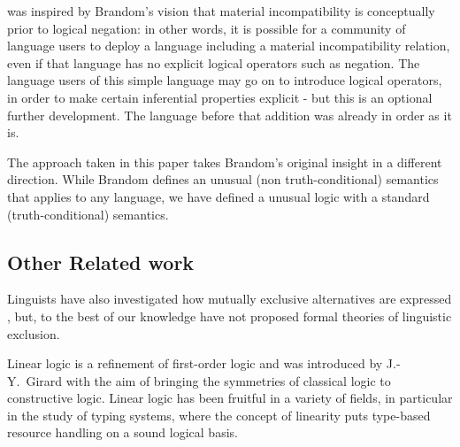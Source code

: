 \ELFULL{} was inspired by Brandom's vision that material incompatibility is conceptually prior to logical negation:
in other words, it is possible for a community of language users to deploy a language including a material incompatibility relation, even if that language has no explicit logical operators such as negation.
The language users of this simple language may go on to introduce logical operators, in order to make certain inferential properties explicit - but this is an optional further development. 
The language before that addition was already in order as it is.

The approach taken in this paper takes Brandom's original insight in a different direction.
While Brandom defines an unusual (non truth-conditional) semantics that applies to any language, we have defined a unusual logic with a standard (truth-conditional) semantics.






\subsection{Other Related work}

Linguists have also investigated how mutually exclusive alternatives
are expressed \cite{OKeeffeA:rouhanocl}, but, to the best of our knowledge have not
proposed formal theories of linguistic exclusion.

Linear logic \cite{GirardJY:linlog,GirardJY:protyp} is a refinement of
first-order logic and was introduced by J.-Y.~Girard with the aim of
bringing the symmetries of classical logic to constructive
logic. Linear logic has been fruitful in a variety of fields, in
particular in the study of typing systems, where the concept of
linearity puts type-based resource handling on a sound logical basis.

